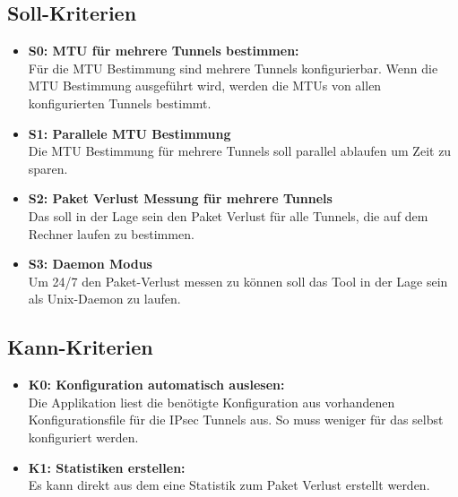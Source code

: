 \subsection{Soll-Kriterien}
\begin{itemize}

\item \textbf{S0: MTU für mehrere Tunnels bestimmen:} \\
Für die \ac{MTU} Bestimmung sind mehrere Tunnels konfigurierbar. Wenn die \ac{MTU} Bestimmung ausgeführt wird, werden die \ac{MTU}s von allen konfigurierten Tunnels bestimmt.

\item \textbf{S1: Parallele MTU Bestimmung} \\
Die \ac{MTU} Bestimmung für mehrere Tunnels soll parallel ablaufen um Zeit zu sparen.

\item \textbf{S2: Paket Verlust Messung für mehrere Tunnels} \\
Das \tool{} soll in der Lage sein den Paket Verlust für alle Tunnels, die auf dem Rechner laufen zu bestimmen.
  	
\item \textbf{S3: Daemon Modus} \\
Um 24/7 den Paket-Verlust messen zu können soll das Tool in der Lage sein als Unix-Daemon zu laufen.

\end{itemize}

\subsection{Kann-Kriterien}
\begin{itemize}

\item \textbf{K0: Konfiguration automatisch auslesen:} \\
Die Applikation liest die benötigte Konfiguration aus vorhandenen Konfigurationsfile für die \acs{IPsec} Tunnels aus. So muss weniger für das \tool selbst konfiguriert werden.

\item \textbf{K1: Statistiken erstellen:} \\
Es kann direkt aus dem \tool eine Statistik zum Paket Verlust erstellt werden.

\end{itemize}
